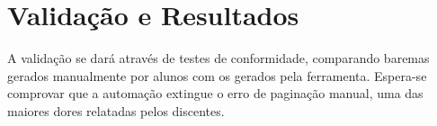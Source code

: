 \chapter{Validação e Resultados}

A validação se dará através de testes de conformidade, comparando baremas gerados manualmente por alunos com os gerados pela ferramenta. Espera-se comprovar que a automação extingue o erro de paginação manual, uma das maiores dores relatadas pelos discentes.
